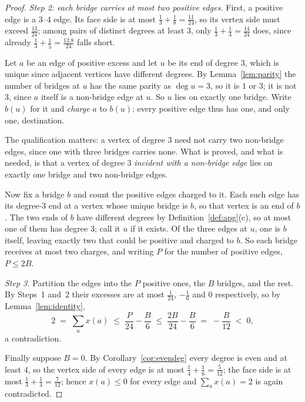 \documentclass{baustms}
\theoremstyle{cupthm}
\theoremstyle{cupdefn}
\theoremstyle{cuprem}
\begin{document}
\begin{proof}
\smallskip
\emph{Step 2: each bridge carries at most two positive edges.} First, a positive
edge is a $3$--$4$ edge. Its face side is at most $\tfrac13+\tfrac18 =
\tfrac{11}{24}$, so its vertex side must exceed $\tfrac{13}{24}$; among pairs of
distinct degrees at least $3$, only $\tfrac13+\tfrac14 = \tfrac{14}{24}$ does,
since already $\tfrac13+\tfrac15 = \tfrac{12.8}{24}$ falls short.

Let $a$ be an edge of positive excess and let $u$ be its end of degree $3$,
which is unique since adjacent vertices have different degrees. By
Lemma~\ref{lem:parity} the number of bridges at $u$ has the same parity as
$\deg u = 3$, so it is $1$ or $3$; it is not $3$, since $a$ itself is a
non-bridge edge at $u$. So $u$ lies on exactly one bridge. Write $b(u)$ for it
and \emph{charge} $a$ to $b(u)$: every positive edge thus has one, and only one,
destination.

The qualification matters: a vertex of degree $3$ need not carry two non-bridge
edges, since one with three bridges carries none. What is proved, and what is
needed, is that a vertex of degree $3$ \emph{incident with a non-bridge edge}
lies on exactly one bridge and two non-bridge edges.

Now fix a bridge $b$ and count the positive edges charged to it. Each such edge
has its degree-$3$ end at a vertex whose unique bridge is $b$, so that vertex is
an end of $b$. The two ends of $b$ have different degrees by
Definition~\ref{def:apg}(c), so at most one of them has degree $3$; call it $u$
if it exists. Of the three edges at $u$, one is $b$ itself, leaving exactly two
that could be positive and charged to $b$. So each bridge receives at most two
charges, and writing $P$ for the number of positive edges, $P \le 2B$.

\smallskip
\emph{Step 3.} Partition the edges into the $P$ positive ones, the $B$ bridges,
and the rest. By Steps~1 and~2 their excesses are at most $\tfrac1{24}$,
$-\tfrac16$ and $0$ respectively, so by Lemma~\ref{lem:identity},
\[
  2 \;=\; \sum_a x(a) \;\le\; \frac{P}{24} - \frac{B}{6}
     \;\le\; \frac{2B}{24} - \frac{B}{6} \;=\; -\frac{B}{12} \;<\; 0 ,
\]
a contradiction.

\smallskip
Finally suppose $B = 0$. By Corollary~\ref{cor:evendeg} every degree is even and
at least $4$, so the vertex side of every edge is at most $\tfrac14+\tfrac16 =
\tfrac5{12}$; the face side is at most $\tfrac13+\tfrac14 = \tfrac7{12}$; hence
$x(a) \le 0$ for every edge and $\sum_a x(a) = 2$ is again contradicted.
\end{proof}
\end{document}

